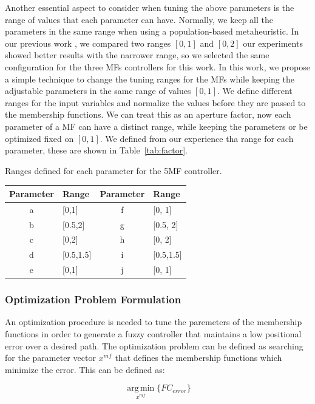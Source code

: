 \documentclass[symmetry,article,submit,moreauthors,pdftex]{Definitions/mdpi}
\begin{document}
Another essential aspect to consider when tuning the above parameters is the
range of values that each parameter can have. Normally, we keep all the
parameters in the same range when using a population-based metaheuristic. In
our previous work \cite{Mancilla2021}, we compared two ranges  
$[0,1]$ and $[0,2]$ our experiments showed better results with the
narrower range, so we selected the same configuration for the three MFs
controllers for this work. In this work, we propose a simple technique to
change the tuning ranges for the MFs while keeping the adjustable parameters in
the same range of values $[0,1]$. We define different ranges for the input
variables and normalize the values before they are passed to the membership
functions. We can treat this as an aperture factor, now each parameter of 
a MF can have a distinct range, while keeping the parameters or be optimized 
fixed on $[0,1]$. We defined from our experience tha range for each parameter, these 
are shown in Table~\ref{tab:factor}.

\begin{specialtable}[H] 
\small
\caption{Ranges defined for each parameter for the 5MF controller.}\label{tab:factor}
\begin{tabular}{clcl}
\toprule
\textbf{Parameter}	& \textbf{Range}& \textbf{Parameter} & \textbf{Range}\\
\midrule
a & [0,1]			& f & [0, 1]\\
b & [0.5,2]			& g & [0.5, 2]\\
c & [0,2]			& h & [0, 2]\\
d & [0.5,1.5]		& i & [0.5,1.5]\\
e & [0,1]			& j & [0, 1]\\
\bottomrule
\end{tabular}
\end{specialtable}

\subsubsection{Optimization Problem Formulation}

An optimization procedure is needed to tune the paremeters of the 
membership functions in order to generate a fuzzy controller that maintains 
a low positional error over a desired path. The optimization problem 
can be defined as searching for the parameter vector $x^{mf}$ that defines the membership functions 
which minimize  the error. This can be defined as: 

\begin{equation}
    \operatorname*{arg\,min}_{x^{mf}} \{ FC_{error}\}
\end{equation}
\end{document}
